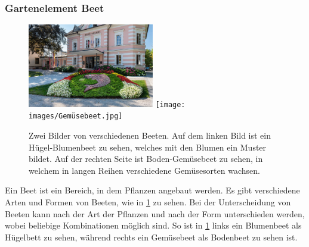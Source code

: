 \subsubsection{Gartenelement Beet}
\begin{figure}[!htb]
	\centering
	\includegraphics[width=0.49\textwidth]{images/Blumenbeet.jpg}
	\texttt{[image: images/Gemüsebeet.jpg]}
	\caption[Bilder von verschiedenen Beeten.]{Zwei Bilder von verschiedenen Beeten.
		Auf dem linken Bild ist ein Hügel-Blumenbeet zu sehen, welches mit den Blumen ein Muster bildet.
		Auf der rechten Seite ist Boden-Gemüsebeet zu sehen, in welchem in langen Reihen verschiedene Gemüsesorten wachsen.\footnotemark
	}
	\label{pic:beet}
\end{figure}


Ein Beet ist ein Bereich, in dem Pflanzen angebaut werden.
Es gibt verschiedene Arten und Formen von Beeten, wie in \cref{pic:beet} zu sehen.
Bei der Unterscheidung von Beeten kann nach der Art der Pflanzen und nach der Form unterschieden werden, wobei beliebige Kombinationen möglich sind.
So ist in \cref{pic:beet} links ein Blumenbeet als Hügelbett zu sehen, während rechts ein Gemüsebeet als Bodenbeet zu sehen ist.

